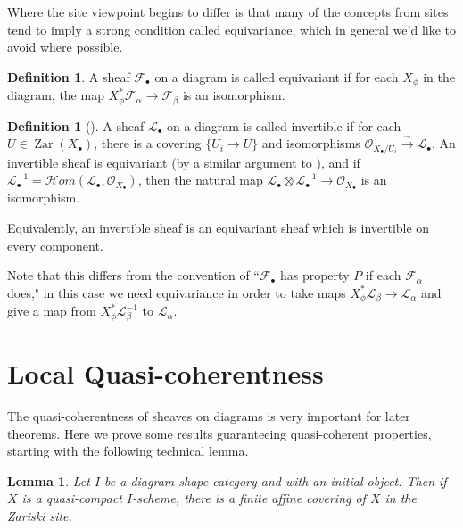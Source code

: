 \documentclass[proquest]{uwthesis}[2014/11/13]
\newtheorem{lemma}[theorem]{Lemma}
\theoremstyle{definition}
\newtheorem{definition}[theorem]{Definition}
\newcommand{\cHom}{\mathcal{H} \textit{om}}
\DeclareMathOperator{\Zar}{Zar}
\newcommand{\FF}{\mathscr{F}}
\newcommand{\LL}{\mathcal{L}}
\newcommand{\OO}{\mathcal{O}}
\begin{document}
Where the site viewpoint begins to differ is that many of the concepts from sites tend to imply a strong condition called equivariance, which in general we'd like to avoid where possible.

\begin{definition}
	A sheaf $\FF_\bullet$ on a diagram is called equivariant if for each $X_\phi$ in the diagram, the map $X_\phi^*\FF_\alpha \rightarrow \FF_\beta$ is an isomorphism.
\end{definition}

\begin{definition}[{\cite[Tag 0408]{stacks}}]
	A sheaf $\LL_\bullet$ on a diagram is called invertible if for each $U \in \Zar(X_\bullet)$, there is a covering $\{U_i \rightarrow U\}$ and isomorphisms $\OO_{X_\bullet/U_i} \xrightarrow{\sim} \LL_\bullet$.
	An invertible sheaf is equivariant (by a similar argument to \cite[II 7.3]{Lipman2009}), and if $\LL_\bullet^{-1} = \cHom(\LL_\bullet, \OO_{X_\bullet})$, then the natural map $\LL_\bullet \otimes \LL_\bullet^{-1} \rightarrow \OO_{X_\bullet}$ is an isomorphism.
	
	Equivalently, an invertible sheaf is an equivariant sheaf which is invertible on every component.
\end{definition}

Note that this differs from the convention of ``$\FF_\bullet$ has property $P$ if each $\FF_\alpha$ does," in this case we need equivariance in order to take maps $X_\phi^* \LL_\beta \rightarrow \LL_\alpha$ and give a map from $X_\phi^* \LL_\beta^{-1}$ to $\LL_\alpha$.

\section{Local Quasi-coherentness}

The quasi-coherentness of sheaves on diagrams is very important for later theorems.
Here we prove some results guaranteeing quasi-coherent properties, starting with the following technical lemma.

	
\begin{lemma}
	\label{lem:affinecover}
	Let $I$ be a diagram shape category and with an initial object.
	Then if $X$ is a quasi-compact $I$-scheme, there is a finite affine covering of $X$ in the Zariski site.
\end{lemma}
\end{document}
